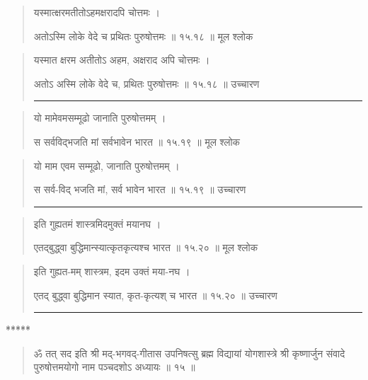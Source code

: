 \begin{quotation}

यस्मात्क्षरमतीतोऽहमक्षरादपि चोत्तमः  ।  

अतोऽस्मि लोके वेदे च प्रथितः पुरुषोत्तमः  ॥ १५.१८ ॥  मूल श्लोक
\end{quotation}

\begin{quotation}

यस्मात क्षरम अतीतोऽ अहम, अक्षराद अपि चोत्तमः  ।  

अतोऽ अस्मि लोके वेदे च, प्रथितः पुरुषोत्तमः  ॥ १५.१८ ॥  उच्चारण

\noindent\rule{16cm}{0.4pt} 
\end{quotation}


\begin{quotation}

यो मामेवमसम्मूढो जानाति पुरुषोत्तमम्‌  ।  

स सर्वविद्भजति मां सर्वभावेन भारत  ॥ १५.१९ ॥  मूल श्लोक
\end{quotation}

\begin{quotation}

यो माम एवम सम्मूढो, जानाति पुरुषोत्तमम्‌  ।  

स सर्व-विद् भजति मां, सर्व भावेन भारत  ॥ १५.१९ ॥  उच्चारण

\noindent\rule{16cm}{0.4pt} 
\end{quotation}


\begin{quotation}

इति गुह्यतमं शास्त्रमिदमुक्तं मयानघ  ।  

एतद्‍बुद्ध्वा बुद्धिमान्स्यात्कृतकृत्यश्च भारत  ॥ १५.२० ॥  मूल श्लोक
\end{quotation}

\begin{quotation}

इति गुह्यत-मम् शास्त्रम, इदम उक्तं मया-नघ  ।  

एतद्‍ बुद्ध्वा बुद्धिमान स्यात, कृत-कृत्यश् च भारत  ॥ १५.२० ॥  उच्चारण

\noindent\rule{16cm}{0.4pt} 
\end{quotation}
\begin{center} ***** \end{center}


\begin{quotation}


ॐ तत् सद इति श्री मद्-भगवद्-गीतास उपनिषत्सु ब्रह्म विद्यायां योगशास्त्रे श्री कृष्णार्जुन संवादे  पुरुषोत्तमयोगो नाम पञ्चदशोऽ अध्यायः  ॥  १५  ॥ 
\end{quotation} 